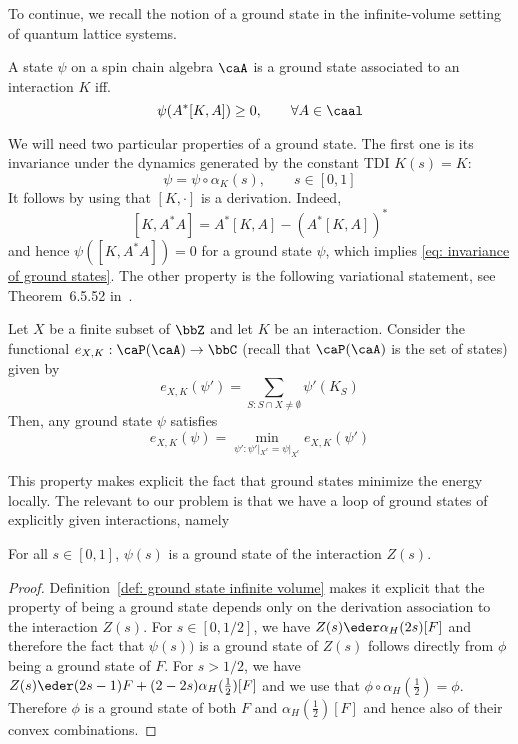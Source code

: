 To continue, we recall the notion of a ground state in the infinite-volume setting of quantum lattice systems.
\begin{definition}\label{def: ground state infinite volume}
	A state $\psi$ on a spin chain algebra $\caA$ is a ground state associated to an interaction $K$ iff.\
	$$
	\psi(A^*[K,A]) \geq 0,\qquad \forall A \in \caal
	$$
\end{definition}
We will need two particular properties of a ground state. The first one is its invariance under the dynamics generated by the constant TDI $K(s)=K$:
\begin{equation}\label{eq: invariance of ground states}
	\psi=\psi\circ\alpha_K(s), \qquad s\in [0,1]
\end{equation}
It follows by using that $[K,\cdot]$ is a derivation. Indeed,
$$
[K,A^*A]=  A^*[K,A] - (A^*[K,A])^*
$$
and hence $\psi([K,A^*A])=0$ for a ground state $\psi$, which implies \eqref{eq: invariance of ground states}. The other property is the following variational statement, see Theorem~6.5.52 in~\cite{BratRob2}.
\begin{lemma}\label{lem: variational principle}
	Let $X$ be a finite subset of $\bbZ$ and let $K$ be an interaction. Consider the functional  $e_{X,K}:\caP(\caA)\to \bbC$ (recall that $\caP(\caA)$ is the set of states) given by
	$$e_{X,K}(\psi')= \sum_{S: S \cap X \neq \emptyset} \psi'(K_S)$$ 
	Then, any ground state $\psi$ satisfies
	$$
	e_{X,K}(\psi)=\min_{\psi':\psi'|_{X^c}=\psi|_{X^c} }  e_{X,K}(\psi')
	$$
\end{lemma}
This property makes explicit the fact that ground states minimize the energy locally. 
The relevant to our problem is that we have a loop of ground states of explicitly given  interactions, namely
\begin{lemma}
	For all $s\in[0,1]$,  $\psi(s)$ is a ground state of the interaction $Z(s)$. 
\end{lemma}
\begin{proof}
	Definition~\ref{def: ground state infinite volume} makes it explicit that the property of being a ground state depends only on the derivation association to the interaction $Z(s)$.  For  $s \in [0,1/2] $, we have $Z(s) \eder \alpha_H(2s)[F]$ and therefore the fact that $\psi(s))$ is a ground state of $Z(s)$ follows directly from $\phi$ being a ground state of $F$.  For $s>1/2$, we have $Z(s) \eder (2s-1)F+    (2-2s)\alpha_H(\tfrac{1}{2})[F]$ and we use that    $\phi\circ\alpha_H(\tfrac{1}{2})=\phi$. Therefore $\phi$ is a ground state of both $F$ and     $\alpha_H(\tfrac{1}{2})[F]$ and hence also of their convex combinations. 
\end{proof}

